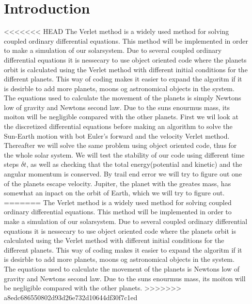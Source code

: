 \documentclass[../main.tex]{subfiles}
\begin{document}
\section{Introduction}\label{introduction}
<<<<<<< HEAD
The Verlet method is a widely used method for solving coupled ordinary differential equations. This method will be implemented  in order to make a simulation of our solarsystem. Due to several coupled ordinary differential equations it is nessecary to use object oriented code where the planets orbit is calculated using the Verlet method with different initial conditions for the different planets. This way of coding makes it easier to expand the algoritm if it is desirble to add more planets, moons og astronomical objects in the system. The equations used to calculate the movement of the planets is simply Newtons low of gravity and Newtons second law. Due to the suns enourmus mass, its moiton will be negligible compared with the other planets.
First we wil look at the discretized differential equations before making an algorithm to solve the Sun-Earth motion with bot Euler's forward and the velocity Verlet method. Thereafter we will solve the same problem using object oriented code, thus for the whole solar system. We will test the stability of our code using different time steps $\delta t$, as well as checking that the total energy(potential and kinetic) and the angular momentum is conserved. By trail end error we will try to figure out one of the planets escape velocity.
Jupiter, the planet with the greates mass, has somewhat an inpact on the orbit of Earth, which we will try to figure out. 
=======
The Verlet method is a widely used method for solving coupled ordinary differential equations. This method will be implemented  in order to make a simulation of our solarsystem.  Due to several coupled ordinary differential equations it is nessecary to use object oriented code where the planets orbit is calculated using the Verlet method with different initial conditions for the different planets. This way of coding makes it easier to expand the algoritm if it is desirble to add more planets, moons og astronomical objects in the system. The equations used to calculate the movement of the planets is Newtons low of gravity and Newtons second law. Due to the suns enourmus mass, its moiton will be negligible compared with the other planets. 
>>>>>>> a8edc686550802d93d26e732d10644df30f7c1ed
\end{document}
